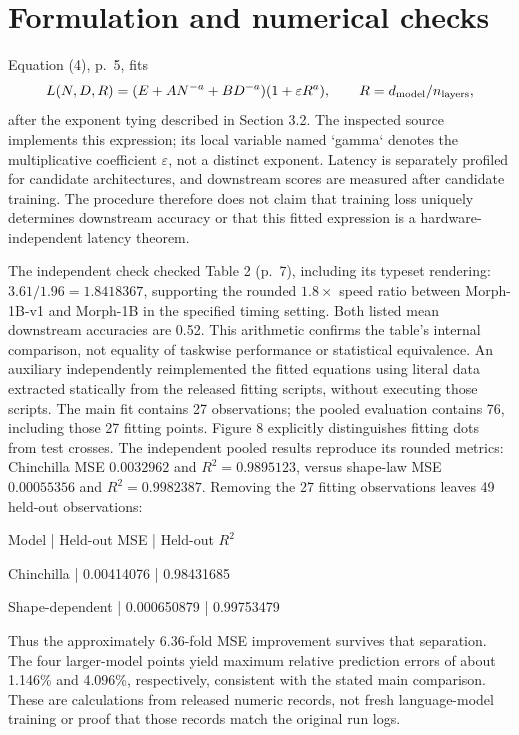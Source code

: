 \documentclass[10pt]{article}
\begin{document}
\section*{Formulation and numerical checks}
Equation (4), p. 5, fits \[L(N,D,R)=(E+AN^{-a}+BD^{-a})(1+\varepsilon R^a),
\qquad R=d_{\rm model}/n_{\rm layers},\] after the exponent tying described in Section 3.2. The inspected source implements this expression; its local variable named `gamma` denotes the multiplicative coefficient \(\varepsilon\), not a distinct exponent. Latency is separately profiled for candidate architectures, and downstream scores are measured after candidate training. The procedure therefore does not claim that training loss uniquely determines downstream accuracy or that this fitted expression is a hardware-independent latency theorem.\par
The independent check checked Table 2 (p. 7), including its typeset rendering: \(3.61/1.96=1.8418367\), supporting the rounded \(1.8\times\) speed ratio between Morph-1B-v1 and Morph-1B in the specified timing setting. Both listed mean downstream accuracies are 0.52. This arithmetic confirms the table’s internal comparison, not equality of taskwise performance or statistical equivalence. An auxiliary independently reimplemented the fitted equations using literal data extracted statically from the released fitting scripts, without executing those scripts. The main fit contains 27 observations; the pooled evaluation contains 76, including those 27 fitting points. Figure 8 explicitly distinguishes fitting dots from test crosses. The independent pooled results reproduce its rounded metrics: Chinchilla MSE \(0.0032962\) and \(R^2=0.9895123\), versus shape-law MSE \(0.00055356\) and \(R^2=0.9982387\). Removing the 27 fitting observations leaves 49 held-out observations:\par
Model | Held-out MSE | Held-out \(R^2\)\par
Chinchilla | 0.00414076 | 0.98431685\par
Shape-dependent | 0.000650879 | 0.99753479\par
Thus the approximately \(6.36\)-fold MSE improvement survives that separation. The four larger-model points yield maximum relative prediction errors of about 1.146\% and 4.096\%, respectively, consistent with the stated main comparison. These are calculations from released numeric records, not fresh language-model training or proof that those records match the original run logs.\par
\end{document}
